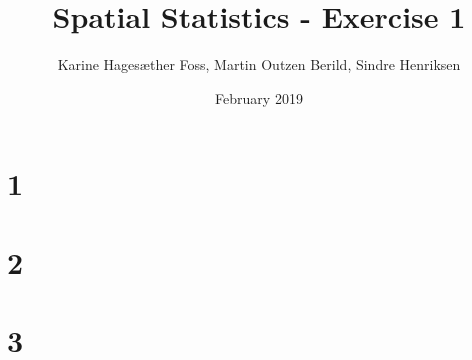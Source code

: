 \documentclass[11pt,a4paper,oneside]{article}
\title{Spatial Statistics - Exercise 1}
\author{Karine Hagesæther Foss, Martin Outzen Berild, Sindre Henriksen}
\date{February 2019}
\begin{document}
\maketitle

\section{1}
\label{sec:problem1}


\section{2}
\label{sec:problem2}


\section{3}
\label{sec:problem3}

\end{document}
